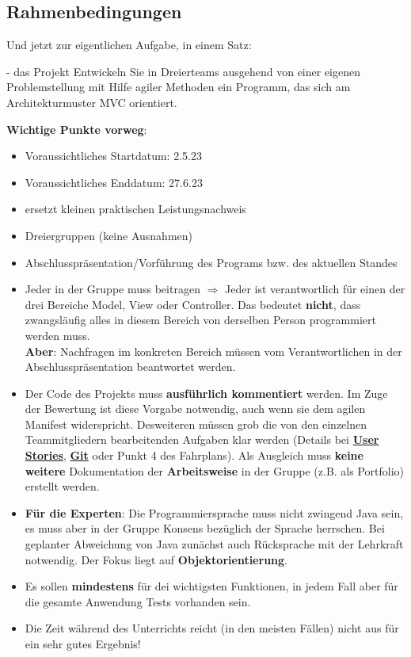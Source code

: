 \documentclass{article}
\begin{document}
\subsection{Rahmenbedingungen}

Und jetzt zur eigentlichen Aufgabe, in einem Satz:

\begin{task}{- das Projekt}
Entwickeln Sie in Dreierteams ausgehend von einer eigenen Problemstellung mit Hilfe agiler Methoden ein Programm, das sich am Architekturmuster MVC orientiert.
\end{task}

\textbf{Wichtige Punkte vorweg}:
\begin{itemize}
    \item Voraussichtliches Startdatum: 2.5.23
    \item Voraussichtliches Enddatum: 27.6.23
    \item ersetzt kleinen praktischen Leistungsnachweis
    \item Dreiergruppen (keine Ausnahmen)
    \item Abschlusspräsentation/Vorführung des Programs bzw. des aktuellen Standes
    \item Jeder in der Gruppe muss beitragen $\Rightarrow$ Jeder ist verantwortlich für einen der drei Bereiche Model, View oder Controller. Das bedeutet \textbf{nicht}, dass zwangsläufig alles in diesem Bereich von derselben Person programmiert werden muss. \\
    \textbf{Aber}: Nachfragen im konkreten Bereich müssen vom Verantwortlichen in der Abschlusspräsentation beantwortet werden.
    \item Der Code des Projekts muss \textbf{ausführlich kommentiert} werden. Im Zuge der Bewertung ist diese Vorgabe notwendig, auch wenn sie dem agilen Manifest widerspricht. Desweiteren müssen grob die von den einzelnen Teammitgliedern bearbeitenden Aufgaben klar werden (Details bei \hyperref[sec:hwUserStories]{\textbf{User Stories}}, \hyperref[sec:git]{\textbf{Git}} oder Punkt 4 des Fahrplans). Als Ausgleich muss \textbf{keine weitere} Dokumentation der \textbf{Arbeitsweise} in der Gruppe (z.B. als Portfolio) erstellt werden.
    \item \textbf{Für die Experten}: Die Programmiersprache muss nicht zwingend Java sein, es muss aber in der Gruppe Konsens bezüglich der Sprache herrschen. Bei geplanter Abweichung von Java zunächst auch Rücksprache mit der Lehrkraft notwendig. Der Fokus liegt auf \textbf{Objektorientierung}.
    \item Es sollen \textbf{mindestens} für dei wichtigsten Funktionen, in jedem Fall aber für die gesamte Anwendung Tests vorhanden sein.
    \item Die Zeit während des Unterrichts reicht (in den meisten Fällen) nicht aus für ein sehr gutes Ergebnis!
\end{itemize}
\end{document}

